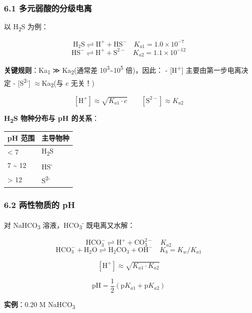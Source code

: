 \documentclass[a4paper,11pt]{ctexart}
\newcounter{none}
\newcommand{\箭}{\ensuremath{\rightarrow}}
\newcommand{\左箭}{\ensuremath{\leftarrow}}
\newcommand{\上箭}{\ensuremath{\uparrow}}
\newcommand{\下箭}{\ensuremath{\downarrow}}
\newcommand{\衡}{\ensuremath{\rightleftharpoons}}
\newcommand{\双箭}{\ensuremath{\leftrightarrow}}
\newcommand{\约等于}{\ensuremath{\approx}}
\newcommand{\小于等于}{\ensuremath{\leq}}
\newcommand{\大于等于}{\ensuremath{\geq}}
\newcommand{\不等于}{\ensuremath{\neq}}
\newcommand{\西格马}{\ensuremath{\sigma}}
\newcommand{\派}{\ensuremath{\pi}}
\begin{document}
\subsubsection{6.1 多元弱酸的分级电离}\label{ux591aux5143ux5f31ux9178ux7684ux5206ux7ea7ux7535ux79bb}

以 H\textsubscript{2}S 为例：

\[
\mathrm{H_2S \rightleftharpoons H^+ + HS^-} \quad K_{a1} = 1.0 \times 10^{-7}
\]
\[
\mathrm{HS^- \rightleftharpoons H^+ + S^{2-}} \quad K_{a2} = 1.1 \times 10^{-12}
\]

\textbf{关键规则}：Ka\textsubscript{1} ≫ Ka\textsubscript{2}(通常差 10\textsuperscript{3}\textasciitilde10\textsuperscript{5} 倍)，因此：
- {[}H\textsuperscript{+}{]} 主要由第一步电离决定
- {[}S\textsuperscript{2-}{]} \约等于 Ka\textsubscript{2}(与 c 无关！)

\[
[\mathrm{H^+}] \approx \sqrt{K_{a1} \cdot c} \qquad [\mathrm{S^{2-}}] \approx K_{a2}
\]

\textbf{H\textsubscript{2}S 物种分布与 pH 的关系}：

{\def\LTcaptype{none} %
\begin{longtable}[]{@{}ll@{}}
\toprule\noalign{}
pH 范围 & 主导物种 \\
\midrule\noalign{}
\endhead
\bottomrule\noalign{}
\endlastfoot
\textless{} 7 & H\textsubscript{2}S \\
7 \textasciitilde{} 12 & HS\textsuperscript{-} \\
\textgreater{} 12 & S\textsuperscript{2-} \\
\end{longtable}
}

\subsubsection{6.2 两性物质的 pH}\label{ux4e24ux6027ux7269ux8d28ux7684-ph}

对 NaHCO\textsubscript{3} 溶液，HCO\textsubscript{3}\textsuperscript{-} 既电离又水解：

\[
\mathrm{HCO_3^- \rightleftharpoons H^+ + CO_3^{2-}} \quad K_{a2}
\]
\[
\mathrm{HCO_3^- + H_2O \rightleftharpoons H_2CO_3 + OH^-} \quad K_b = K_w/K_{a1}
\]

\[
\boxed{[\mathrm{H^+}] \approx \sqrt{K_{a1} \cdot K_{a2}}}
\]

\[
\boxed{\mathrm{pH} = \frac{1}{2}(\mathrm{p}K_{a1} + \mathrm{p}K_{a2})}
\]

\textbf{实例}：0.20 M NaHCO\textsubscript{3}
\end{document}
